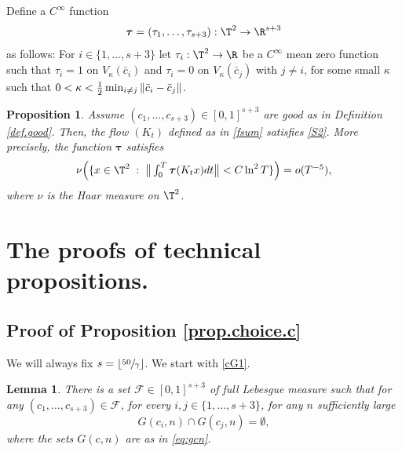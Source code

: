 \documentclass[10pt]{amsart}
\let\DS\relax
\let\ts\textstyle
\newcommand\cF{\mathcal{F}}
\newcommand\btau{{\boldsymbol{\tau}}}
\theoremstyle{definition}
\theoremstyle{plain}
\newtheorem{lemma}[definition]{Lemma}
\newtheorem{proposition}[definition]{Proposition}
\begin{document}
Define a $C^\infty$ function
\[
\btau=(\tau_1,\ldots,\tau_{s+3}):\T^2\to \R^{s+3}
\]
as follows: For $i\in\{1,\ldots, s+3\}$ let $\tau_i:\T^2\to \R$ be a $C^\infty$ mean zero function such that $\tau_i=1$ on $V_\kappa (\bar{c}_i)$ and $\tau_i=0$ on $V_\kappa(\bar{c}_j)$ with $j\neq i$, for some small $\kappa$ such that $\DS 0<\kappa<\frac{1}{2}\min_{i\neq j}\|\bar{c}_i-\bar{c}_j\|$.

\begin{proposition} \label{prop.choice.tau} Assume $(c_1,\ldots,c_{s+3})\in [0,1]^{s+3}$ are {\it good} as in Definition \ref{def.good}. Then, the flow $(K_t)$ defined as in \eqref{fsum} satisfies \eqref{S2}. More precisely, the function $\btau$ satisfies
\[\ts
\nu\Big(\{x\in \T^2\;:\; \big\|\int_0^T\btau(K_tx)dt\big\|<C\ln^2 T \}\Big)=o(T^{-5}),
\]
where $\nu$ is the Haar measure on $\T^2$.
\end{proposition}

\section{The proofs of technical propositions.}
\label{ScTechnical}
\subsection{Proof of Proposition \ref{prop.choice.c}} \label{sec.c.choice}
We will always fix $s=\lfloor \sfrac{50}{\gamma} \rfloor$.
We start with \eqref{cG1}.
\begin{lemma} \label{lemma.G1} There is a set $\cF\in [0,1]^{s+3}$ of full Lebesgue measure such that for any $(c_1,\ldots,c_{s+3})\in \cF$, for every $i,j \in \{1,\ldots, s+3\}$, for any $n$ sufficiently large
\[
G(c_i,n)\cap G(c_j,n)=\emptyset,
\]
where the sets $G(c,n)$ are as in \eqref{eq:gcn}.
\end{lemma}
\end{document}
